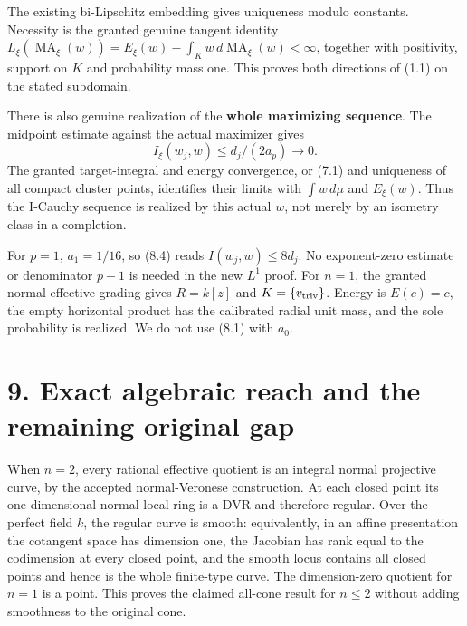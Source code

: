 \documentclass[
  10pt,
]{article}
\begin{document}
The existing bi-Lipschitz embedding gives uniqueness modulo constants.
Necessity is the granted genuine tangent identity
\(L_\xi(\operatorname{MA}_\xi(w))=E_\xi(w)-\int_Kw\,d\operatorname{MA}_\xi(w)<\infty\),
together with positivity, support on \(K\) and probability mass one.
This proves both directions of (1.1) on the stated subdomain.

There is also genuine realization of the \textbf{whole maximizing
sequence}. The midpoint estimate against the actual maximizer gives \[
I_\xi(w_j,w)\le d_j/(2a_p)\longrightarrow0.                           \tag{8.4}
\] The granted target-integral and energy convergence, or (7.1) and
uniqueness of all compact cluster points, identifies their limits with
\(\int w\,d\mu\) and \(E_\xi(w)\). Thus the I-Cauchy sequence is
realized by this actual \(w\), not merely by an isometry class in a
completion.

For \(p=1\), \(a_1=1/16\), so (8.4) reads \(I(w_j,w)\le8d_j\). No
exponent-zero estimate or denominator \(p-1\) is needed in the new
\(L^1\) proof. For \(n=1\), the granted normal effective grading gives
\(R=k[z]\) and \(K=\{v_{\rm triv}\}\). Energy is \(E(c)=c\), the empty
horizontal product has the calibrated radial unit mass, and the sole
probability is realized. We do not use (8.1) with \(a_0\).

\section{9. Exact algebraic reach and the remaining original
gap}\label{exact-algebraic-reach-and-the-remaining-original-gap}

When \(n=2\), every rational effective quotient is an integral normal
projective curve, by the accepted normal-Veronese construction. At each
closed point its one-dimensional normal local ring is a DVR and
therefore regular. Over the perfect field \(k\), the regular curve is
smooth: equivalently, in an affine presentation the cotangent space has
dimension one, the Jacobian has rank equal to the codimension at every
closed point, and the smooth locus contains all closed points and hence
is the whole finite-type curve. The dimension-zero quotient for \(n=1\)
is a point. This proves the claimed all-cone result for \(n\le2\)
without adding smoothness to the original cone.
\end{document}
